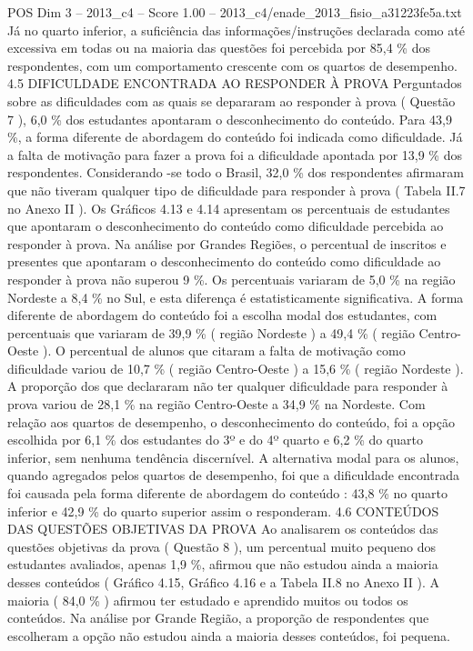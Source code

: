 \begin{textsample}{POS Dim 3 – 2013\_c4 – Score 1.00 – 2013\_c4/enade\_2013\_fisio\_a31223fe5a.txt}
Já no quarto inferior, a suficiência das informações/instruções declarada como até excessiva em todas ou na maioria das questões foi percebida por 85,4 \% dos respondentes, com um comportamento crescente com os quartos de desempenho. 4.5 DIFICULDADE ENCONTRADA AO RESPONDER À PROVA Perguntados sobre as dificuldades com as quais se depararam ao responder à prova ( Questão 7 ), 6,0 \% dos estudantes apontaram o desconhecimento do conteúdo.
Para 43,9 \%, a forma diferente de abordagem do conteúdo foi indicada como dificuldade.
Já a falta de motivação para fazer a prova foi a dificuldade apontada por 13,9 \% dos respondentes.
Considerando -se todo o Brasil, 32,0 \% dos respondentes afirmaram que não tiveram qualquer tipo de dificuldade para responder à prova ( Tabela II.7 no Anexo II ).
Os Gráficos 4.13 e 4.14 apresentam os percentuais de estudantes que apontaram o desconhecimento do conteúdo como dificuldade percebida ao responder à prova.
Na análise por Grandes Regiões, o percentual de inscritos e presentes que apontaram o desconhecimento do conteúdo como dificuldade ao responder à prova não superou 9 \%.
Os percentuais variaram de 5,0 \% na região Nordeste a 8,4 \% no Sul, e esta diferença é estatisticamente significativa.
A forma diferente de abordagem do conteúdo foi a escolha modal dos estudantes, com percentuais que variaram de 39,9 \% ( região Nordeste ) a 49,4 \% ( região Centro-Oeste ).
O percentual de alunos que citaram a falta de motivação como dificuldade variou de 10,7 \% ( região Centro-Oeste ) a 15,6 \% ( região Nordeste ).
A proporção dos que declararam não ter qualquer dificuldade para responder à prova variou de 28,1 \% na região Centro-Oeste a 34,9 \% na Nordeste.
Com relação aos quartos de desempenho, o desconhecimento do conteúdo, foi a opção escolhida por 6,1 \% dos estudantes do 3º e do 4º quarto e 6,2 \% do quarto inferior, sem nenhuma tendência discernível.
A alternativa modal para os alunos, quando agregados pelos quartos de desempenho, foi que a dificuldade encontrada foi causada pela forma diferente de abordagem do conteúdo : 43,8 \% no quarto inferior e 42,9 \% do quarto superior assim o responderam. 4.6 CONTEÚDOS DAS QUESTÕES OBJETIVAS DA PROVA Ao analisarem os conteúdos das questões objetivas da prova ( Questão 8 ), um percentual muito pequeno dos estudantes avaliados, apenas 1,9 \%, afirmou que não estudou ainda a maioria desses conteúdos ( Gráfico 4.15, Gráfico 4.16 e a Tabela II.8 no Anexo II ).
A maioria ( 84,0 \% ) afirmou ter estudado e aprendido muitos ou todos os conteúdos.
Na análise por Grande Região, a proporção de respondentes que escolheram a opção não estudou ainda a maioria desses conteúdos, foi pequena.

\end{textsample}
